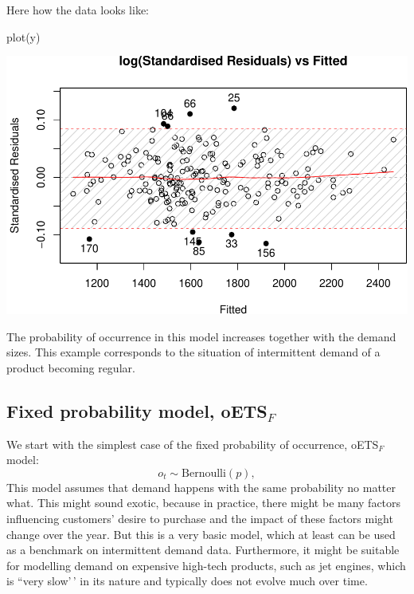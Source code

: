 \documentclass[
]{book}
\newenvironment{Shaded}{\begin{snugshade}}{\end{snugshade}}
\newcommand{\FunctionTok}[1]{\textcolor[rgb]{0.00,0.00,0.00}{#1}}
\newcommand{\NormalTok}[1]{#1}
\theoremstyle{definition}
\theoremstyle{definition}
\theoremstyle{definition}
\theoremstyle{definition}
\theoremstyle{remark}
\begin{document}
Here how the data looks like:

\begin{Shaded}
\begin{Highlighting}[]
\FunctionTok{plot}\NormalTok{(y)}
\end{Highlighting}
\end{Shaded}

\includegraphics{adam_files/figure-latex/unnamed-chunk-112-1.pdf}

The probability of occurrence in this model increases together with the demand sizes. This example corresponds to the situation of intermittent demand of a product becoming regular.

\hypertarget{fixed-probability-model-oets_f}{%
\subsection{\texorpdfstring{Fixed probability model, oETS\(_F\)}{Fixed probability model, oETS\_F}}\label{fixed-probability-model-oets_f}}

We start with the simplest case of the fixed probability of occurrence, oETS\(_F\) model:
\begin{equation}
    o_t \sim \text{Bernoulli}(p) ,
    \label{eq:oETSFixed}
\end{equation}
This model assumes that demand happens with the same probability no matter what. This might sound exotic, because in practice, there might be many factors influencing customers' desire to purchase and the impact of these factors might change over the year. But this is a very basic model, which at least can be used as a benchmark on intermittent demand data. Furthermore, it might be suitable for modelling demand on expensive high-tech products, such as jet engines, which is ``very slow'\,' in its nature and typically does not evolve much over time.
\end{document}
